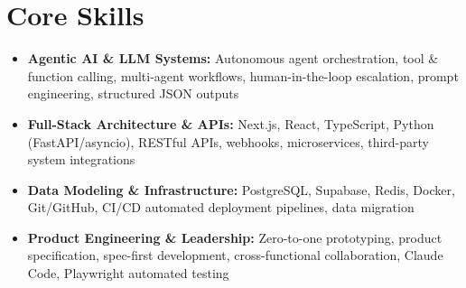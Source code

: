 \documentclass[a4paper,10pt]{article}
\begin{document}
\section{Core Skills}
\begin{itemize}
 \item \textbf{Agentic AI \& LLM Systems:} Autonomous agent orchestration, tool \& function calling, multi-agent workflows, human-in-the-loop escalation, prompt engineering, structured JSON outputs
 \item \textbf{Full-Stack Architecture \& APIs:} Next.js, React, TypeScript, Python (FastAPI/asyncio), RESTful APIs, webhooks, microservices, third-party system integrations
 \item \textbf{Data Modeling \& Infrastructure:} PostgreSQL, Supabase, Redis, Docker, Git/GitHub, CI/CD automated deployment pipelines, data migration
 \item \textbf{Product Engineering \& Leadership:} Zero-to-one prototyping, product specification, spec-first development, cross-functional collaboration, Claude Code, Playwright automated testing
\end{itemize}
\end{document}
